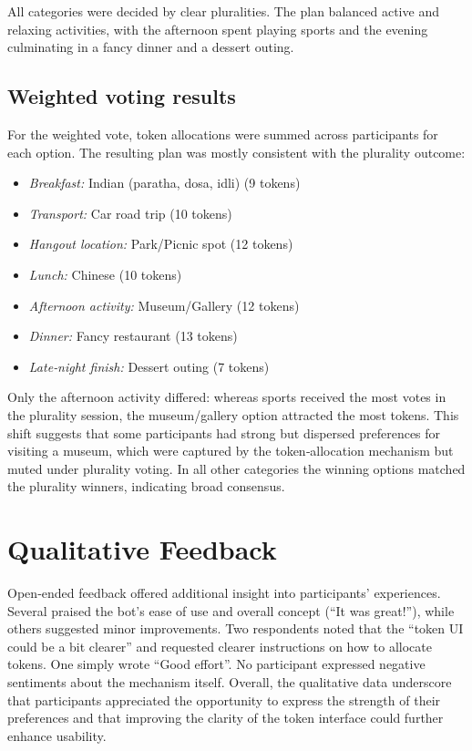 All categories were decided by clear pluralities.  The plan balanced active and relaxing activities, with the afternoon spent playing sports and the evening culminating in a fancy dinner and a dessert outing.

\subsection*{Weighted voting results}

For the weighted vote, token allocations were summed across participants for each option.  The resulting plan was mostly consistent with the plurality outcome:

\begin{itemize}
    \item \emph{Breakfast:} Indian (paratha, dosa, idli) (9 tokens)
    \item \emph{Transport:} Car road trip (10 tokens)
    \item \emph{Hangout location:} Park/Picnic spot (12 tokens)
    \item \emph{Lunch:} Chinese (10 tokens)
    \item \emph{Afternoon activity:} Museum/Gallery (12 tokens)
    \item \emph{Dinner:} Fancy restaurant (13 tokens)
    \item \emph{Late‑night finish:} Dessert outing (7 tokens)
\end{itemize}

Only the afternoon activity differed: whereas sports received the most votes in the plurality session, the museum/gallery option attracted the most tokens.  This shift suggests that some participants had strong but dispersed preferences for visiting a museum, which were captured by the token‑allocation mechanism but muted under plurality voting.  In all other categories the winning options matched the plurality winners, indicating broad consensus.

\section{Qualitative Feedback}

Open‑ended feedback offered additional insight into participants’ experiences.  Several praised the bot’s ease of use and overall concept (``It was great!''), while others suggested minor improvements.  Two respondents noted that the ``token UI could be a bit clearer'' and requested clearer instructions on how to allocate tokens.  One simply wrote ``Good effort''.  No participant expressed negative sentiments about the mechanism itself.  Overall, the qualitative data underscore that participants appreciated the opportunity to express the strength of their preferences and that improving the clarity of the token interface could further enhance usability.

